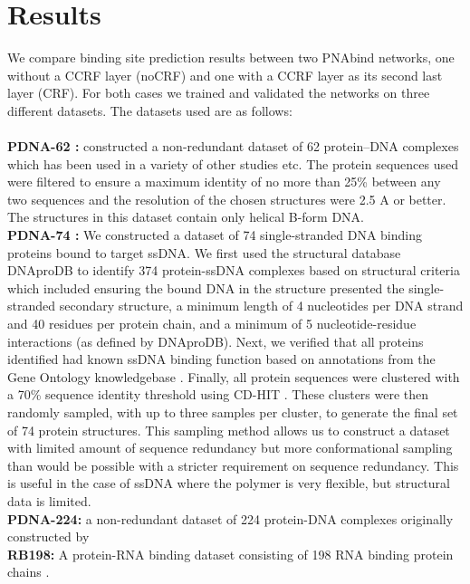 \section{Results} We compare binding site prediction results between two PNAbind networks, one
without a CCRF layer (noCRF) and one with a CCRF layer as its second last layer (CRF). For both
cases we trained and validated the networks on three different datasets. The datasets used are as
follows:\\ \\ \textbf{PDNA-62 :} \citet{ahmad2004analysis} constructed a non-redundant dataset of 62
protein–DNA complexes which has been used in a variety of other studies
\citep{kuznetsov2006transient, wang2006bindn} etc. The protein sequences used were filtered to
ensure a maximum identity of no more than 25\% between any two sequences and the resolution of the
chosen structures were 2.5 A or better. The structures in this dataset contain only helical B-form
DNA.\\ \textbf{PDNA-74 :} We constructed a dataset of 74 single-stranded DNA binding proteins bound
to target ssDNA. We first used the structural database DNAproDB
\citep{sagendorf2017dnaprodb,sagendorf2020dnaprodb} to identify 374 protein-ssDNA complexes based on
structural criteria which included ensuring the bound DNA in the structure presented the
single-stranded secondary structure, a minimum length of 4 nucleotides per DNA strand and 40
residues per protein chain, and a minimum of 5 nucleotide-residue interactions (as defined by
DNAproDB). Next, we verified that all proteins identified had known ssDNA binding function based on
annotations from the Gene Ontology knowledgebase \citep{gene2019gene}.  Finally, all protein
sequences were clustered with a 70\% sequence identity threshold using CD-HIT \citep{li2006cd}.
These clusters were then randomly sampled, with up to three samples per cluster, to generate the
final set of 74 protein structures. This sampling method allows us to construct a dataset with
limited amount of sequence redundancy but more conformational sampling than would be possible with a
stricter requirement on sequence redundancy. This is useful in the case of ssDNA where the polymer
is very flexible, but structural data is limited.\\ \textbf{PDNA-224:} a non-redundant dataset of
        224 protein-DNA complexes originally constructed by \citet{li2013predna}\\ \textbf{RB198: }
        A protein-RNA binding dataset consisting of 198 RNA binding protein chains
        \citep{walia2012protein}.

